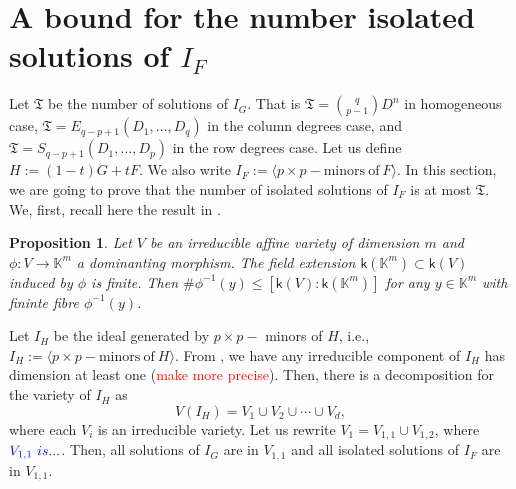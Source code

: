 \documentclass[11pt]{article}
\numberwithin{Property}{section}
\numberwithin{Theorem}{section}
\newtheorem{Proposition}{Proposition}%
\numberwithin{Proposition}{section}
\numberwithin{Lemma}{section}
\numberwithin{Corollary}{section}
\numberwithin{Definition}{section}
\numberwithin{Remark}{section}
\numberwithin{Conjecture}{section}
\numberwithin{Problem}{section}
\numberwithin{Example}{section}
\numberwithin{Claim}{section}
\renewcommand{\leq}{\leqslant}
\newcommand{\field}{\mathbb{K}} %
\newcommand{\todo}[1]{\textcolor{red}{#1}} %
\newcommand{\improve}[1]{\textcolor{blue}{#1}} %
\begin{document}
\section{A bound for the number isolated solutions of $I_F$}
Let $\mathfrak{T}$ be the number of solutions of $I_G$. That is $\mathfrak{T} = {q \choose {p-1}}D^n$ in homogeneous case, $\mathfrak{T} = E_{q-p+1}(D_1, \ldots, D_q)$ in the column degrees case, and $\mathfrak{T} = S_{q-p+1}(D_1, \ldots, D_p)$ in the row degrees case. Let us define $H := (1-t)G + tF$. We also write $I_F := \langle p \times p - \mathrm{minors \ of \ } F\rangle$. In this section, we are going to prove that the number of isolated solutions of $I_F$ is at most $\mathfrak{T}$. We, first, recall here the result in \cite[Proposition~1]{Hen83}. 
\begin{Proposition}\label{hen} Let $V$ be an irreducible affine variety of dimension $m$ and $\phi: V \to \field^m$ a dominanting morphism. The field extension $\mathsf{k}(\field^m) \subset \mathsf{k}(V)$ induced by $\phi$ is finite. Then $\#\phi^{-1}(y) \leq [ \mathsf{k}(V) : \mathsf{k}(\field^m)]$ for any $y \in \field^m$ with fininte fibre $\phi^{-1}(y)$.
\end{Proposition}

Let $I_H$ be the ideal generated by $p \times p-$ minors of $H$, i.e., $I_H := \langle p \times p - \mathrm{minors \ of \ } H \rangle$. From \cite[Section~6]{Eagon188}, we have any irreducible component of $I_H$ has dimension at least one (\todo{make more precise}). Then, there is a decomposition for the variety of $I_H$ as 
\[
V(I_H) = V_1 \cup V_2 \cup \cdots \cup V_d, \] where each $V_i$
is an irreducible variety. Let us rewrite $V_1 = V_{1,1} \cup V_{1,2}$, where $\improve{V_{1,1} \ is ...} $. Then, all solutions of $I_G$ are in $V_{1,1}$ and all isolated solutions of $I_F$ are in $V_{1,1}$. 
\end{document}
